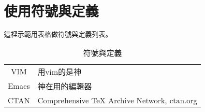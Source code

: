 \documentclass[class=NCU_thesis, crop=false, float=true]{standalone}
\begin{document}


\chapter{使用符號與定義}
這裡示範用表格做符號與定義列表。

\begin{table}[h]
	\fontsize{14}{25}\selectfont  %
	\centering
	\begin{tabular}{c@{\quad}@{：}l}
		VIM     & 用vim的是神 \\ 
		Emacs   & 神在用的編輯器 \\ 
		CTAN    & Comprehensive TeX Archive Network, ctan.org \\
		
	\end{tabular} 
	\caption{符號與定義} %
	\label{table:symbol_def}
\end{table}
\end{document}
